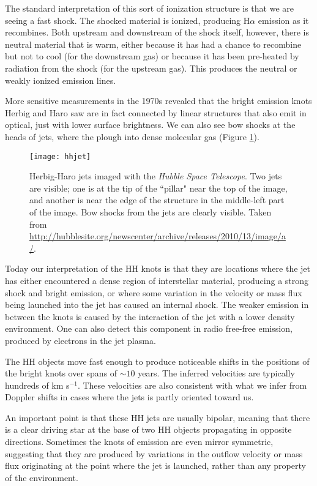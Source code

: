 The standard interpretation of this sort of ionization structure is that we are seeing a fast shock. The shocked material is ionized, producing H$\alpha$ emission as it recombines. Both upstream and downstream of the shock itself, however, there is neutral material that is warm, either because it has had a chance to recombine but not to cool (for the downstream gas) or because it has been pre-heated by radiation from the shock (for the upstream gas). This produces the neutral or weakly ionized emission lines.

More sensitive measurements in the 1970s revealed that the bright emission knots Herbig and Haro saw are in fact connected by linear structures that also emit in optical, just with lower surface brightness. We can also see bow shocks at the heads of jets, where the plough into dense molecular gas (Figure \ref{fig:hhjet}).

\begin{figure}
\texttt{[image: hhjet]}
\caption[Herbig-Haro jets from \textit{HST}]{
\label{fig:hhjet}
Herbig-Haro jets imaged with the \textit{Hubble Space Telescope}. Two jets are visible; one is at the tip of the ``pillar" near the top of the image, and another is near the edge of the structure in the middle-left part of the image. Bow shocks from the jets are clearly visible. Taken from \url{http://hubblesite.org/newscenter/archive/releases/2010/13/image/a/}.
}
\end{figure}

Today our interpretation of the HH knots is that they are locations where the jet has either encountered a dense region of interstellar material, producing a strong shock and bright emission, or where some variation in the velocity or mass flux being launched into the jet has caused an internal shock. The weaker emission in between the knots is caused by the interaction of the jet with a lower density environment. One can also detect this component in radio free-free emission, produced by electrons in the jet plasma.

The HH objects move fast enough to produce noticeable shifts in the positions of the bright knots over spans of $\sim 10$ years. The inferred velocities are typically hundreds of km s$^{-1}$. These velocities are also consistent with what we infer from Doppler shifts in cases where the jets is partly oriented toward us.

An important point is that these HH jets are usually bipolar, meaning that there is a clear driving star at the base of two HH objects propagating in opposite directions. Sometimes the knots of emission are even mirror symmetric, suggesting that they are produced by variations in the outflow velocity or mass flux originating at the point where the jet is launched, rather than any property of the environment.

